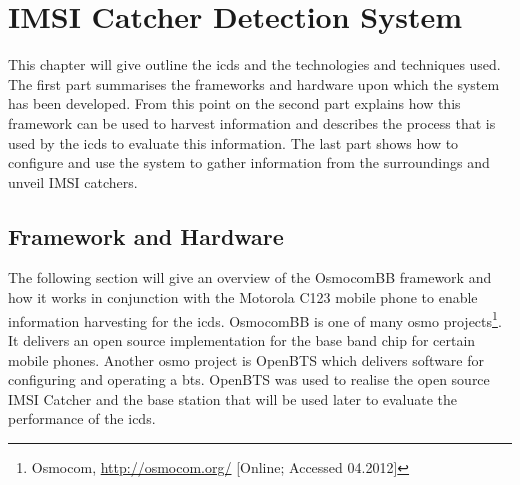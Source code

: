 \chapter{IMSI Catcher Detection System}

This chapter will give outline the \gls{icds} and the technologies and techniques used.
The first part summarises the frameworks and hardware upon which the system has been developed.
From this point on the second part explains how this framework can be used to harvest information and describes the process that is used by the \gls{icds} to evaluate this information.
The last part shows how to configure and use the system to gather information from the surroundings and unveil IMSI catchers.

\section{Framework and Hardware}
The following section will give an overview of the OsmocomBB framework and how it works in conjunction with the Motorola C123 mobile phone to enable information harvesting for the \gls{icds}.
OsmocomBB is one of many \gls{osmo} projects\footnote{Osmocom, \url{http://osmocom.org/} [Online; Accessed 04.2012]}. It delivers an open source implementation for the base band chip for certain mobile phones.
Another \gls{osmo} project is OpenBTS which delivers software for configuring and operating a \gls{bts}.
OpenBTS was used to realise the open source IMSI Catcher \cite{dennis} and the base station that will be used later to evaluate the performance of the \gls{icds}.

